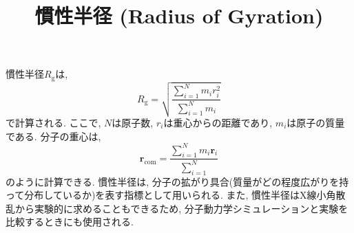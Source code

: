 





\title{慣性半径 (Radius of Gyration)}
\maketitle

慣性半径$R_{\mathrm{g}}$は, 
\begin{equation}
    R_{\mathrm{g}} =
    \sqrt{\frac{\sum_{i=1}^{N} m_{i} r_{i}^{2}}{\sum_{i=1}^{N} m_{i}}}
\end{equation}
で計算される. ここで, $N$は原子数, $r_{i}$は重心からの距離であり, $m_{i}$は原子の質量である. 
分子の重心は, 
\begin{equation}
    \bm{r}_{\mathrm{com}} =
    \frac{\sum_{i=1}^{N} m_{i} \bm{r}_{i}}{\sum_{i=1}^{N}}
\end{equation}
のように計算できる. 
慣性半径は, 分子の拡がり具合(質量がどの程度広がりを持って分布しているか)を表す指標として用いられる. 
また, 慣性半径はX線小角散乱から実験的に求めることもできるため, 分子動力学シミュレーションと実験を比較するときにも使用される. 


% 
% 

